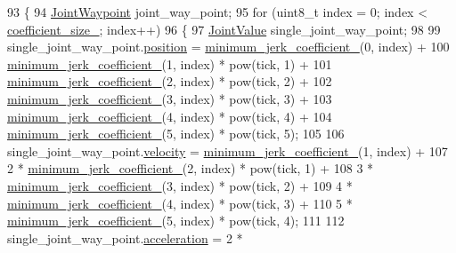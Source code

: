 \begin{DoxyCode}
93 \{
94   \hyperlink{namespacerobotis__manipulator_a4456fd8b14e1f6b7733a77837dfe9339}{JointWaypoint} joint\_way\_point;
95   \textcolor{keywordflow}{for} (uint8\_t index = 0; index < \hyperlink{classrobotis__manipulator_1_1_joint_trajectory_abfc3d7ff3a5789f818ce2a483118458a}{coefficient\_size\_}; index++)
96   \{
97     \hyperlink{structrobotis__manipulator_1_1_point}{JointValue} single\_joint\_way\_point;
98 
99     single\_joint\_way\_point.\hyperlink{structrobotis__manipulator_1_1_point_a0f122386b502d9b316bdead542ed2145}{position} = \hyperlink{classrobotis__manipulator_1_1_joint_trajectory_a74b431132c75c6840b70ea62f65d3c48}{minimum\_jerk\_coefficient\_}(0, index) 
      +
100              \hyperlink{classrobotis__manipulator_1_1_joint_trajectory_a74b431132c75c6840b70ea62f65d3c48}{minimum\_jerk\_coefficient\_}(1, index) * pow(tick, 1) +
101              \hyperlink{classrobotis__manipulator_1_1_joint_trajectory_a74b431132c75c6840b70ea62f65d3c48}{minimum\_jerk\_coefficient\_}(2, index) * pow(tick, 2) +
102              \hyperlink{classrobotis__manipulator_1_1_joint_trajectory_a74b431132c75c6840b70ea62f65d3c48}{minimum\_jerk\_coefficient\_}(3, index) * pow(tick, 3) +
103              \hyperlink{classrobotis__manipulator_1_1_joint_trajectory_a74b431132c75c6840b70ea62f65d3c48}{minimum\_jerk\_coefficient\_}(4, index) * pow(tick, 4) +
104              \hyperlink{classrobotis__manipulator_1_1_joint_trajectory_a74b431132c75c6840b70ea62f65d3c48}{minimum\_jerk\_coefficient\_}(5, index) * pow(tick, 5);
105 
106     single\_joint\_way\_point.\hyperlink{structrobotis__manipulator_1_1_point_a4eaec95fac0c755eb0aa704b36ebe97b}{velocity} = \hyperlink{classrobotis__manipulator_1_1_joint_trajectory_a74b431132c75c6840b70ea62f65d3c48}{minimum\_jerk\_coefficient\_}(1, index) 
      +
107              2 * \hyperlink{classrobotis__manipulator_1_1_joint_trajectory_a74b431132c75c6840b70ea62f65d3c48}{minimum\_jerk\_coefficient\_}(2, index) * pow(tick, 1) +
108              3 * \hyperlink{classrobotis__manipulator_1_1_joint_trajectory_a74b431132c75c6840b70ea62f65d3c48}{minimum\_jerk\_coefficient\_}(3, index) * pow(tick, 2) +
109              4 * \hyperlink{classrobotis__manipulator_1_1_joint_trajectory_a74b431132c75c6840b70ea62f65d3c48}{minimum\_jerk\_coefficient\_}(4, index) * pow(tick, 3) +
110              5 * \hyperlink{classrobotis__manipulator_1_1_joint_trajectory_a74b431132c75c6840b70ea62f65d3c48}{minimum\_jerk\_coefficient\_}(5, index) * pow(tick, 4);
111 
112     single\_joint\_way\_point.\hyperlink{structrobotis__manipulator_1_1_point_adb49f1fbcc0eaa7f530c54fdf0ede836}{acceleration} = 2 * 

\end{DoxyCode}
